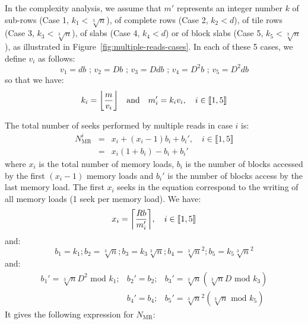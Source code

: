\documentclass[10pt, conference, compsocconf]{IEEEtran}
\DeclarePairedDelimiter{\ceil}{\lceil}{\rceil}
\DeclarePairedDelimiter{\floor}{\lfloor}{\rfloor}
\begin{document}
In the complexity analysis, we assume that $m'$ represents an integer
number $k$ of sub-rows (Case 1, $k_1<\sqrt[3]{n}$), of complete rows
(Case 2, $k_2<d$), of tile rows (Case 3, $k_3<\sqrt[3]{n}$), of slabs
(Case 4, $k_4<d$) or of block slabs (Case 5, $k_5<\sqrt[3]{n}$), as
illustrated in Figure~\ref{fig:multiple-reads-cases}. In each of these
5 cases, we define $v_i$ as follows:
\begin{equation*}
  v_1=db \text{ ; }  v_2=Db \text{ ; } v_3=Ddb \text{ ; } v_4=D^2b \text{ ; } v_5=D^2db
\end{equation*}
so that we have:
\begin{equation*}
k_i=\floor*{\frac{m}{v_i}} \quad \mathrm{and} \quad m_i'=k_iv_i, \quad i \in \llbracket 1,5 \rrbracket
\end{equation*}

The total number of seeks performed by multiple reads in case $i$ is:
\begin{eqnarray*}
  N^i_{\mathrm{MR}} &=& x_i + (x_i-1)b_i +b_i', \quad i \in \llbracket 1,5 \rrbracket\\
  &=& x_i \left(1+b_i\right)-b_i+b_i'
\end{eqnarray*}
where $x_i$ is the total number of memory loads, $b_i$ is the
number of blocks accessed by the first $(x_i-1)$ memory loads and
$b_i'$ is the number of blocks access by the last memory load. The
first $x_i$ seeks in the equation correspond to the writing of all memory
loads (1 seek per memory load). We have:
\begin{equation*}
  x_i = \ceil*{\frac{Rb}{m_i'}}, \quad i \in \llbracket 1,5 \rrbracket
\end{equation*}
and:
\begin{equation*}
b_1=k_1 ; b_2=\sqrt[3]{n} ; b_3 = k_3\sqrt[3]{n} ; b_4=\sqrt[3]{n}^2 ; b_5=k_5\sqrt[3]{n}^2
\end{equation*}
and:
\begin{eqnarray*}
b_1'=\sqrt[3]{n}D^2\text{ mod }k_1; &b_2'=b_2;   & b_3' = \sqrt[3]{n}\left( \sqrt[3]{n}D\text{ mod }k_3\right)\\
                                   &b_4'=b_4;  & b_5'=\sqrt[3]{n}^2\left( \sqrt[3]{n}\text{ mod }k_5\right) 
\end{eqnarray*}
It gives the following expression for $N_\mathrm{MR}$:
\end{document}
